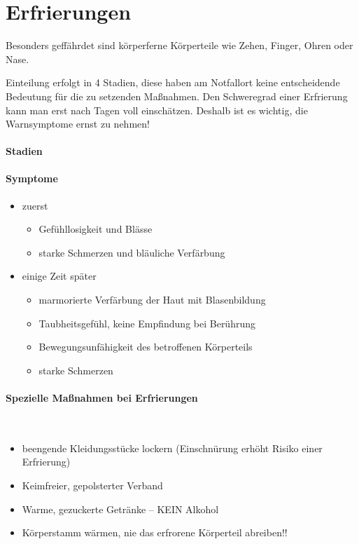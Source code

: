 \section{Erfrierungen}

Besonders geff\"ahrdet sind k\"orperferne K\"orperteile wie Zehen,
Finger, Ohren oder Nase.

Einteilung erfolgt in 4 Stadien, diese haben am Notfallort keine
entscheidende Bedeutung f\"ur die zu setzenden Ma{\ss}nahmen. Den
Schweregrad einer Erfrierung kann man erst nach Tagen voll
einsch\"atzen. Deshalb ist es wichtig, die Warnsymptome ernst zu
nehmen!

\paragraph{Stadien}


\paragraph{Symptome}

\begin{itemize}
    \item zuerst
    \begin{itemize}
        \item Gef\"uhllosigkeit und Bl\"asse
        \item starke Schmerzen und bl\"auliche Verf\"arbung
    \end{itemize}
    \item einige Zeit sp\"ater
    \begin{itemize}
        \item  marmorierte Verf\"arbung der Haut mit  Blasenbildung
        \item Taubheitsgef\"uhl, keine Empfindung bei  Ber\"uhrung
        \item Bewegungsunf\"ahigkeit des betroffenen  K\"orperteils
        \item starke Schmerzen
    \end{itemize}
\end{itemize}


\begin{gMassnahmenEnv}
    \paragraph{Spezielle Ma{\ss}nahmen bei Erfrierungen}~
\begin{itemize}
\item beengende Kleidungsst\"ucke lockern (Einschn\"urung erh\"oht
Risiko einer Erfrierung)
\item Keimfreier, gepolsterter Verband
\item Warme, gezuckerte Getr\"anke -- KEIN Alkohol
\item K\"orperstamm w\"armen, nie das erfrorene K\"orperteil abreiben!!
\end{itemize}
\end{gMassnahmenEnv}




